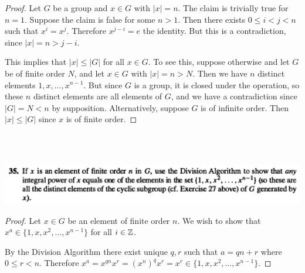 \begin{proof}
  Let $G$ be a group and $x \in G$ with $|x| = n$. The claim is trivially true for $n = 1$. Suppose
  the claim is false for some $n > 1$. Then there exists $0 \leq i < j < n$ such that $x^i = x^j$.
  Therefore $x^{j - i} = e$ the identity. But this is a contradiction, since $|x| = n > j - i$.

  This implies that $|x| \leq |G|$ for all $x \in G$. To see this, suppose otherwise and let $G$ be of
  finite order $N$, and let $x \in G$ with $|x| = n > N$. Then we have $n$ distinct
  elements $1, x, \ldots, x^{n-1}$. But since $G$ is a group, it is closed under the operation, so
  these $n$ distinct elements are all elements of $G$, and we have a contradiction
  since $|G| = N < n$ by supposition. Alternatively, suppose $G$ is of infinite order.
  Then $|x| \leq |G|$ since $x$ is of finite order.
\end{proof}




~\\~\\
\begin{mdframed}
\includegraphics[width=400pt]{img/algebra--nf--1--problem-set-1-7561.png}
\end{mdframed}

\begin{proof}
  Let $x \in G$ be an element of finite order $n$. We wish to show
  that $x^a \in \{1, x, x^2, \ldots, x^{n-1}\}$ for all $i \in \mathbb{Z}$.

  By the Division Algorithm there exist unique $q, r$ such that $a = qn + r$ where $0 \leq r < n$.
  Therefore $x^a = x^{qn}x^r = (x^n)^qx^r = x^r \in \{1, x, x^2, \ldots, x^{n-1}\}$.
\end{proof}
